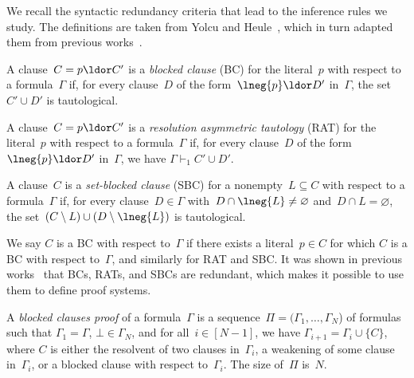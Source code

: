 \documentclass[10pt,a4paper]{article}
\begin{document}
We recall the syntactic redundancy criteria that lead to the inference rules we study.
The definitions are taken from Yolcu and Heule~\cite[Section~3]{YH23},
which in turn adapted them from previous works~\cite{Kul99b,JHB12,KSTB18,HKB20,BT21}.

\begin{definition}\label{def:blocked-clause}
  A clause~$C = p \ldor C'$ is a \emph{blocked clause} (BC)
  for the literal~$p$ with respect to a formula~$\Gamma$
  if, for every clause~$D$ of the form~$\lneg{p} \ldor D'$ in~$\Gamma$,
  the set~$C' \cup D'$ is tautological.
\end{definition}

\begin{definition}\label{def:resolution-asymmetric-tautology}
  A clause~$C = p \ldor C'$ is a \emph{resolution asymmetric tautology} (RAT)
  for the literal~$p$ with respect to a formula~$\Gamma$
  if, for every clause~$D$ of the form~$\lneg{p} \ldor D'$ in~$\Gamma$,
  we have $\Gamma \vdash_1 C' \cup D'$.
\end{definition}

\begin{definition}\label{def:set-blocked-clause}
  A clause~$C$ is a \emph{set-blocked clause} (SBC)
  for a nonempty~$L \subseteq C$ with respect to a formula~$\Gamma$
  if, for every clause~$D \in \Gamma$
  with~$D \cap \lneg{L} \neq \varnothing$ and~$D \cap L = \varnothing$,
  the set~$(C \setminus L) \cup (D \setminus \lneg{L})$ is tautological.
\end{definition}

We say $C$ is a BC with respect to~$\Gamma$
if there exists a literal~$p \in C$
for which $C$ is a BC with respect to~$\Gamma$,
and similarly for RAT and SBC\@.
It was shown in previous works~\cite{Kul99b,JHB12,KSTB18}
that BCs, RATs, and SBCs are redundant,
which makes it possible to use them to define proof systems.

\begin{definition}
  A \emph{blocked clauses proof} of a formula~$\Gamma$
  is a sequence~$\Pi = (\Gamma_1, \dots, \Gamma_N$) of formulas
  such that $\Gamma_1 = \Gamma$, $\bot \in \Gamma_N$,
  and for all~$i \in [N - 1]$, we have $\Gamma_{i+1} = \Gamma_i \cup \{C\}$,
  where $C$ is either the resolvent of two clauses in~$\Gamma_i$,
  a weakening of some clause in~$\Gamma_i$,
  or a blocked clause with respect to~$\Gamma_i$.
  The size of~$\Pi$ is~$N$.
\end{definition}
\end{document}
